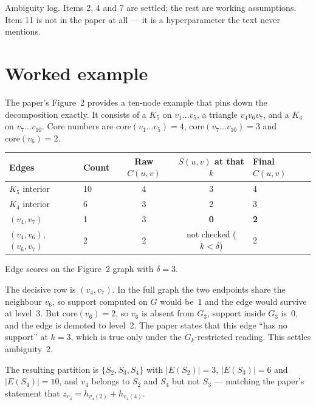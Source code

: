 \documentclass[11pt,a4paper]{article}
\begin{document}
\begin{center}
\vspace{0.4em}
{\small Ambiguity log. Items 2, 4 and 7 are settled; the rest are working assumptions.
 Item 11 is not in the paper at all --- it is a hyperparameter the text never mentions.}
\end{center}

\section{Worked example}
\label{sec:example}

The paper's Figure~2 provides a ten-node example that pins down the decomposition exactly. It
consists of a $K_5$ on $v_1 \ldots v_5$, a triangle $v_4 v_6 v_7$, and a $K_4$ on
$v_7 \ldots v_{10}$. Core numbers are $\mathrm{core}(v_1 \ldots v_5) = 4$,
$\mathrm{core}(v_7 \ldots v_{10}) = 3$ and $\mathrm{core}(v_6) = 2$.

\begin{center}\small
\begin{tabular}{@{}llccl@{}}
\toprule
Edges & Count & Raw $C(u,v)$ & $S(u,v)$ at that $k$ & Final $C(u,v)$ \\
\midrule
$K_5$ interior                & 10 & 4 & 3 & 4 \\
$K_4$ interior                &  6 & 3 & 2 & 3 \\
$(v_4,v_7)$                   &  1 & 3 & \textbf{0} & \textbf{2} \\
$(v_4,v_6)$, $(v_6,v_7)$      &  2 & 2 & not checked ($k < \delta$) & 2 \\
\bottomrule
\end{tabular}

\vspace{0.4em}
{\small Edge scores on the Figure~2 graph with $\delta = 3$.}
\end{center}

The decisive row is $(v_4, v_7)$. In the full graph the two endpoints share the neighbour $v_6$, so
support computed on $G$ would be~1 and the edge would survive at level~3. But $\mathrm{core}(v_6) =
2$, so $v_6$ is absent from $G_3$, support inside $G_3$ is~0, and the edge is demoted to level~2.
The paper states that this edge ``has no support'' at $k=3$, which is true only under the
$G_k$-restricted reading. This settles ambiguity~2.

The resulting partition is $\{S_2, S_3, S_4\}$ with $|E(S_2)| = 3$, $|E(S_3)| = 6$ and
$|E(S_4)| = 10$, and $v_4$ belongs to $S_2$ and $S_4$ but not $S_3$ --- matching the paper's
statement that $z_{v_4} = h_{v_4(2)} + h_{v_4(4)}$.
\end{document}
